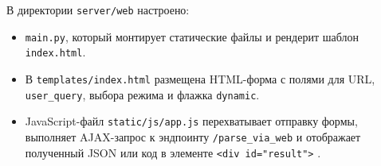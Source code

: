 В директории \texttt{server/web} настроено:
\begin{itemize}
    \item \texttt{main.py}, который монтирует статические файлы и рендерит шаблон \texttt{index.html}.
    \item В \texttt{templates/index.html} размещена HTML-форма с полями для URL, \texttt{user\_query}, выбора режима и флажка \texttt{dynamic}.
    \item JavaScript-файл \texttt{static/js/app.js} перехватывает отправку формы, выполняет AJAX-запрос к эндпоинту \texttt{/parse\_via\_web} и отображает полученный JSON или код в элементе \texttt{<div id="result">} \cite{Jinja2Documentation}.
\end{itemize}